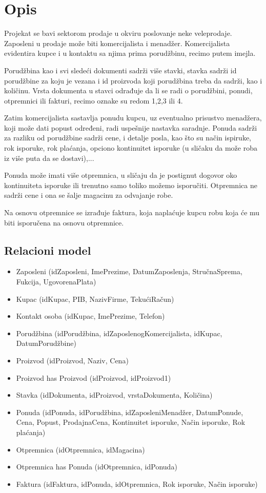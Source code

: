 \section{Opis}

Projekat se bavi sektorom prodaje u okviru poslovanje neke veleprodaje. Zaposleni u prodaje može biti komercijalista i menadžer. Komercijalista evidentira kupce i u kontaktu sa njima prima porudžbinu, recimo putem imejla. 

Porudžbina kao i svi sledeći dokumenti sadrži više stavki, stavka sadrži id porudžbine za koju je vezana i id proizvoda koji porudžbina treba da sadrži, kao i količinu.
Vrsta dokumenta u stavci odrađuje da li se radi o porudžbini, ponudi, otpremnici ili fakturi, recimo oznake su redom 1,2,3 ili 4.

Zatim komercijalista sastavlja ponudu kupcu, uz eventualno prisustvo menadžera, koji može dati popust određeni, radi uspešnije nastavka saradnje. Ponuda sadrži za razliku od porudžbine sadrži cene, i detalje posla, kao što su način ispiruke, rok isporuke, rok plaćanja, opciono kontinuitet isporuke (u sličaku da može roba iz više puta da se dostavi),... 

Ponuda može imati više otpremnica, u sličaju da je postignut dogovor oko kontinuiteta isporuke ili trenutno samo toliko možemo isporučiti. Otpremnica ne sadrži cene i ona se šalje magacinu za odvajanje robe. 

Na osnovu otpremnice se izrađuje faktura, koja naplaćuje kupcu robu koja će mu biti isporučena na osnovu otpremnice.

\subsection{Relacioni model}
\begin{itemize}
\item Zaposleni (idZaposleni, ImePrezime, DatumZaposlenja, StručnaSprema, Fukcija, UgovorenaPlata)
\item Kupac (idKupac, PIB, NazivFirme, TekućiRačun)
\item Kontakt osoba (idKupac, ImePrezime, Telefon)
\item Porudžbina (idPorudžbina, idZaposlenogKomercijalista, idKupac, DatumPorudžbine)
\item Proizvod (idProizvod, Naziv, Cena)
\item Proizvod has Proizvod (idProizvod, idProizvod1)
\item Stavka (idDokumenta, idProizvod, vrstaDokumenta, Količina)
\item Ponuda (idPonuda, idPorudžbina, idZaposleniMenadžer, DatumPonude, Cena, Popust, ProdajnaCena, Kontinuitet isporuke, Način isporuke, Rok plaćanja)
\item Otpremnica (idOtpremnica, idMagacina)
\item Otpremnica has Ponuda (idOtpremnica, idPonuda)
\item Faktura (idFaktura, idPonuda, idOtpremnica, Rok isporuke, Način isporuke)
\end{itemize}

